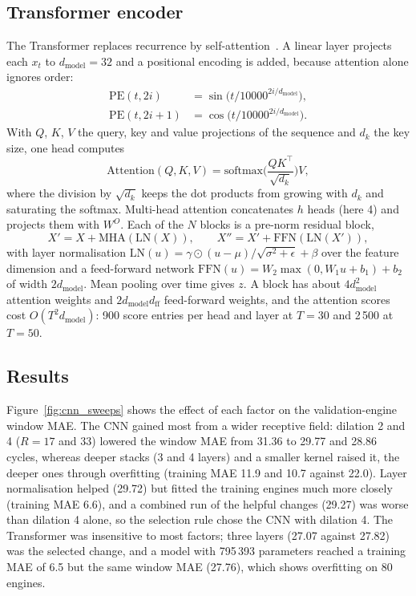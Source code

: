 \subsection{Transformer encoder}
The Transformer replaces recurrence by self-attention~\cite{vaswani_2017_transformer}.  A linear layer projects each $x_t$ to $d_{\mathrm{model}}=32$ and a positional encoding is added, because attention alone ignores order:
\begin{align}
\mathrm{PE}(t,2i)&=\sin\!\big(t/10000^{2i/d_{\mathrm{model}}}\big),\\
\mathrm{PE}(t,2i{+}1)&=\cos\!\big(t/10000^{2i/d_{\mathrm{model}}}\big).
\end{align}
With $Q$, $K$, $V$ the query, key and value projections of the sequence and $d_k$ the key size, one head computes
\begin{equation}
\mathrm{Attention}(Q,K,V)=\mathrm{softmax}\!\Big(\frac{QK^\top}{\sqrt{d_k}}\Big)V,
\end{equation}
where the division by $\sqrt{d_k}$ keeps the dot products from growing with $d_k$ and saturating the softmax.  Multi-head attention concatenates $h$ heads (here 4) and projects them with $W^O$.  Each of the $N$ blocks is a pre-norm residual block,
\begin{equation}
X'=X+\mathrm{MHA}(\mathrm{LN}(X)),\qquad X''=X'+\mathrm{FFN}(\mathrm{LN}(X')),
\end{equation}
with layer normalisation $\mathrm{LN}(u)=\gamma\odot(u-\mu)/\sqrt{\sigma^2+\epsilon}+\beta$ over the feature dimension and a feed-forward network $\mathrm{FFN}(u)=W_2\max(0,W_1u+b_1)+b_2$ of width $2d_{\mathrm{model}}$.  Mean pooling over time gives $z$.  A block has about $4d_{\mathrm{model}}^2$ attention weights and $2d_{\mathrm{model}}d_{\mathrm{ff}}$ feed-forward weights, and the attention scores cost $O(T^2d_{\mathrm{model}})$: 900 score entries per head and layer at $T=30$ and 2\,500 at $T=50$.

\subsection{Results}
Figure~\ref{fig:cnn_sweeps} shows the effect of each factor on the validation-engine window MAE.  The CNN gained most from a wider receptive field: dilation 2 and 4 ($R=17$ and $33$) lowered the window MAE from 31.36 to 29.77 and 28.86 cycles, whereas deeper stacks (3 and 4 layers) and a smaller kernel raised it, the deeper ones through overfitting (training MAE 11.9 and 10.7 against 22.0).  Layer normalisation helped (29.72) but fitted the training engines much more closely (training MAE 6.6), and a combined run of the helpful changes (29.27) was worse than dilation 4 alone, so the selection rule chose the CNN with dilation 4.  The Transformer was insensitive to most factors; three layers (27.07 against 27.82) was the selected change, and a model with 795\,393 parameters reached a training MAE of 6.5 but the same window MAE (27.76), which shows overfitting on 80 engines.

